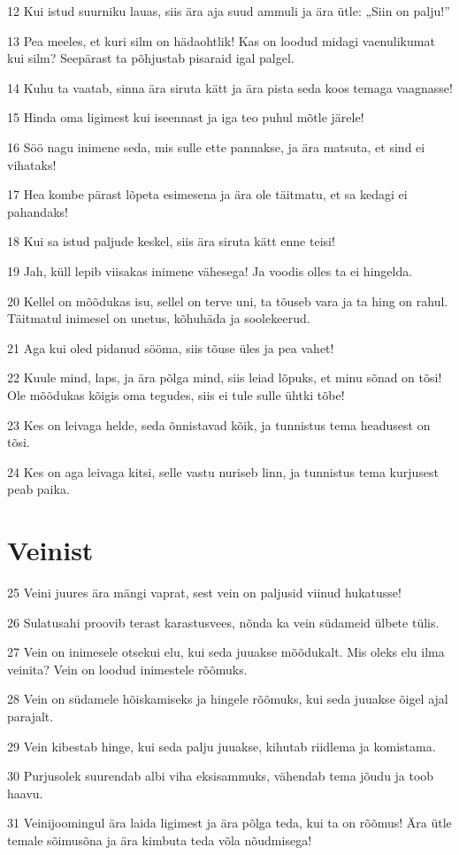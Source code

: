 \par 12 Kui istud suurniku lauas, siis ära aja suud ammuli ja ära ütle: „Siin on palju!”
\par 13 Pea meeles, et kuri silm on hädaohtlik! Kas on loodud midagi vaenulikumat kui silm? Seepärast ta põhjustab pisaraid igal palgel.
\par 14 Kuhu ta vaatab, sinna ära siruta kätt ja ära pista seda koos temaga vaagnasse!
\par 15 Hinda oma ligimest kui iseennast ja iga teo puhul mõtle järele!
\par 16 Söö nagu inimene seda, mis sulle ette pannakse, ja ära matsuta, et sind ei vihataks!
\par 17 Hea kombe pärast lõpeta esimesena ja ära ole täitmatu, et sa kedagi ei pahandaks!
\par 18 Kui sa istud paljude keskel, siis ära siruta kätt enne teisi!
\par 19 Jah, küll lepib viisakas inimene vähesega! Ja voodis olles ta ei hingelda.
\par 20 Kellel on mõõdukas isu, sellel on terve uni, ta tõuseb vara ja ta hing on rahul. Täitmatul inimesel on unetus, kõhuhäda ja soolekeerud.
\par 21 Aga kui oled pidanud sööma, siis tõuse üles ja pea vahet!
\par 22 Kuule mind, laps, ja ära põlga mind, siis leiad lõpuks, et minu sõnad on tõsi! Ole mõõdukas kõigis oma tegudes, siis ei tule sulle ühtki tõbe!
\par 23 Kes on leivaga helde, seda õnnistavad kõik, ja tunnistus tema headusest on tõsi.
\par 24 Kes on aga leivaga kitsi, selle vastu nuriseb linn, ja tunnistus tema kurjusest peab paika.

\section*{Veinist}

\par 25 Veini juures ära mängi vaprat, sest vein on paljusid viinud hukatusse!
\par 26 Sulatusahi proovib terast karastusvees, nõnda ka vein südameid ülbete tülis.
\par 27 Vein on inimesele otsekui elu, kui seda juuakse mõõdukalt. Mis oleks elu ilma veinita? Vein on loodud inimestele rõõmuks.
\par 28 Vein on südamele hõiskamiseks ja hingele rõõmuks, kui seda juuakse õigel ajal parajalt.
\par 29 Vein kibestab hinge, kui seda palju juuakse, kihutab riidlema ja komistama.
\par 30 Purjusolek suurendab albi viha eksisammuks, vähendab tema jõudu ja toob haavu.
\par 31 Veinijoomingul ära laida ligimest ja ära põlga teda, kui ta on rõõmus! Ära ütle temale sõimusõna ja ära kimbuta teda võla nõudmisega!

